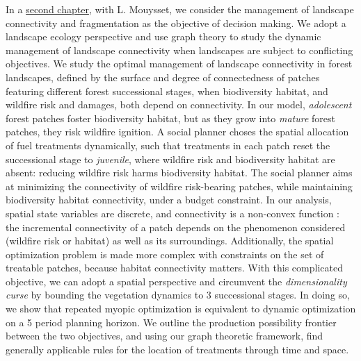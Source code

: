 In a \hyperref[chapter2]{second chapter}, with L. Mouysset, we consider the management of landscape connectivity and fragmentation as the objective of decision making. We adopt a landscape ecology perspective and use graph theory to study the dynamic management of landscape connectivity when landscapes are subject to conflicting objectives.  We study the optimal management of landscape connectivity in forest landscapes, defined by the surface and degree of connectedness of patches featuring different forest successional stages, when biodiversity habitat, and wildfire risk and damages, both depend on connectivity. In our model,  \textit{adolescent} forest patches foster biodiversity habitat, but as they grow into \textit{mature} forest patches, they risk wildfire ignition. A social planner choses the spatial allocation of fuel treatments dynamically, such that treatments in each patch reset the successional stage to \textit{juvenile}, where wildfire risk and biodiversity habitat are absent: reducing wildfire risk harms biodiversity habitat. The social planner aims at minimizing the connectivity of wildfire risk-bearing patches, while maintaining biodiversity habitat connectivity, under a budget constraint. In our analysis, spatial state variables are discrete, and connectivity is a non-convex function : the incremental connectivity of a patch depends on the phenomenon considered (wildfire risk or habitat) as well as its surroundings. Additionally, the spatial optimization problem is made more complex with constraints on the set of treatable patches, because habitat connectivity matters. With this complicated objective, we can adopt a spatial perspective and circumvent the \textit{dimensionality curse} by bounding the vegetation dynamics to 3 successional stages. In doing so, we show that repeated myopic optimization is equivalent to dynamic optimization on a 5 period planning horizon. We outline the production possibility frontier between the two objectives, and using our graph theoretic framework, find generally applicable rules for the location of treatments through time and space. \\


